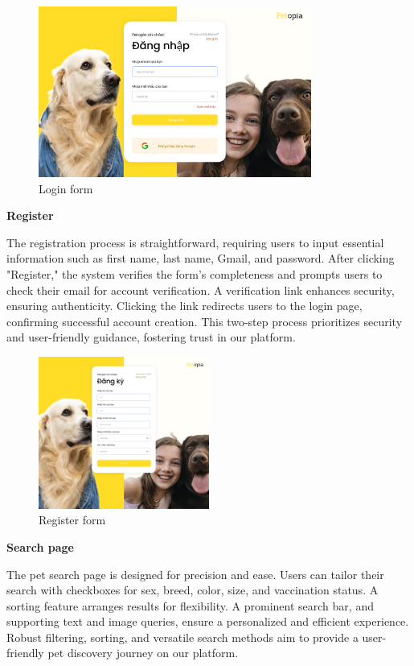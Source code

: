 \begin{figure}[H]
    \centering
    \includegraphics[width=0.8\textwidth]{Figures/login_ui.png}
    \caption{Login form}
\end{figure}

\textbf{Register}

The registration process is straightforward, requiring users to input essential information such as first name, last name, Gmail, and password. After clicking "Register," the system verifies the form's completeness and prompts users to check their email for account verification. A verification link enhances security, ensuring authenticity. Clicking the link redirects users to the login page, confirming successful account creation. This two-step process prioritizes security and user-friendly guidance, fostering trust in our platform.

\begin{figure}[H]
    \centering
    \includegraphics[width=0.5\textwidth]{Figures/register_ui.png}
    \caption{Register form}
\end{figure}

\textbf{Search page}

The pet search page is designed for precision and ease. Users can tailor their search with checkboxes for sex, breed, color, size, and vaccination status. A sorting feature arranges results for flexibility. A prominent search bar, and supporting text and image queries, ensure a personalized and efficient experience. Robust filtering, sorting, and versatile search methods aim to provide a user-friendly pet discovery journey on our platform.

